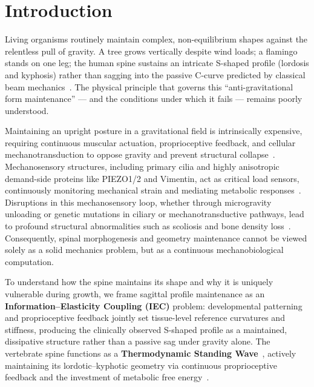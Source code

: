 \documentclass[11pt]{article}
\begin{document}
\section{Introduction}

Living organisms routinely maintain complex, non-equilibrium shapes against the relentless pull of gravity. A tree grows vertically despite wind loads; a flamingo stands on one leg; the human spine sustains an intricate S-shaped profile (lordosis and kyphosis) rather than sagging into the passive C-curve predicted by classical beam mechanics~\cite{thompson1917growth, goriely2017mathematics, niklas1994plant}. The physical principle that governs this ``anti-gravitational form maintenance'' --- and the conditions under which it fails --- remains poorly understood.

Maintaining an upright posture in a gravitational field is intrinsically expensive, requiring continuous muscular actuation, proprioceptive feedback, and cellular mechanotransduction to oppose gravity and prevent structural collapse~\cite{latimer2005upright, bastien2013unifying, govey2013gravity, proximo2012proprioception}. Mechanosensory structures, including primary cilia and highly anisotropic demand-side proteins like PIEZO1/2 and Vimentin, act as critical load sensors, continuously monitoring mechanical strain and mediating metabolic responses~\cite{Assaraf_2020, Coste_2010, wuest2025vim}. Disruptions in this mechanosensory loop, whether through microgravity unloading or genetic mutations in ciliary or mechanotransductive pathways, lead to profound structural abnormalities such as scoliosis and bone density loss~\cite{lv2023yap, djebar2024astrogliosis, ramli2024piezo1}. Consequently, spinal morphogenesis and geometry maintenance cannot be viewed solely as a solid mechanics problem, but as a continuous mechanobiological computation.

To understand how the spine maintains its shape and why it is uniquely vulnerable during growth, we frame sagittal profile maintenance as an \textbf{Information--Elasticity Coupling (IEC)} problem: developmental patterning and proprioceptive feedback jointly set tissue-level reference curvatures and stiffness, producing the clinically observed S-shaped profile as a maintained, dissipative structure rather than a passive sag under gravity alone. The vertebrate spine functions as a \textbf{Thermodynamic Standing Wave}~\cite{prigogine1977self}, actively maintaining its lordotic--kyphotic geometry via continuous proprioceptive feedback and the investment of metabolic free energy~\cite{friston2013life}.
\end{document}
